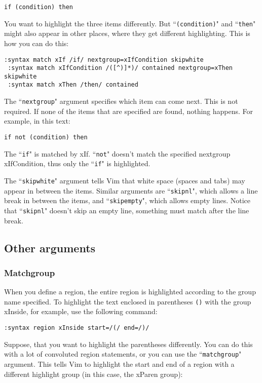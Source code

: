 \begin{Verbatim}[samepage=true]
    if (condition) then 
\end{Verbatim}

You want to highlight the three items differently.
But ``\texttt{(condition)}" and ``\texttt{then}" might also appear in other places, where they get different highlighting.
This is how you can do this:

\begin{Verbatim}[samepage=true]
 :syntax match xIf /if/ nextgroup=xIfCondition skipwhite
 :syntax match xIfCondition /([^)]*)/ contained nextgroup=xThen skipwhite
 :syntax match xThen /then/ contained
\end{Verbatim}

The ``\texttt{nextgroup}" argument specifies which item can come next.
This is not required.
If none of the items that are specified are found, nothing happens.
For example, in this text:

\begin{Verbatim}[samepage=true]
    if not (condition) then 
\end{Verbatim}

The ``\texttt{if}" is matched by xIf.
``\texttt{not}" doesn't match the specified nextgroup xIfCondition, thus only the ``\texttt{if}" is highlighted.

The ``\texttt{skipwhite}" argument tells Vim that white space (spaces and tabs) may appear in between the items.
Similar arguments are ``\texttt{skipnl}", which allows a line break in between the items, and ``\texttt{skipempty}", which allows empty lines.
Notice that ``\texttt{skipnl}" doesn't skip an empty line, something must match after the line break.
\subsection{Other arguments}
\subsubsection{Matchgroup}
When you define a region, the entire region is highlighted according to the group name specified.
To highlight the text enclosed in parentheses \texttt{()} with the group xInside, for example, use the following command:

\begin{Verbatim}[samepage=true]
 :syntax region xInside start=/(/ end=/)/
\end{Verbatim}

Suppose, that you want to highlight the parentheses differently.
You can do this with a lot of convoluted region statements, or you can use the ``\texttt{matchgroup}" argument.
This tells Vim to highlight the start and end of a region with a different highlight group (in this case, the xParen group):

